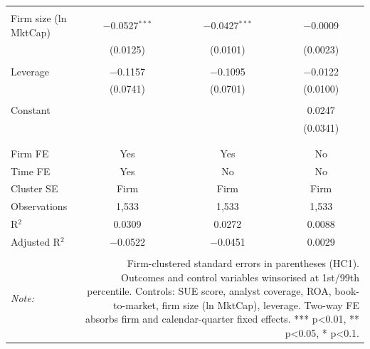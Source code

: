 \begin{table}[!htbp]
\begin{tabular}{@{\extracolsep{5pt}}lccc}
  & & & \\ 
 Firm size (ln MktCap) & $-$0.0527$^{***}$ & $-$0.0427$^{***}$ & $-$0.0009 \\ 
  & (0.0125) & (0.0101) & (0.0023) \\ 
  & & & \\ 
 Leverage & $-$0.1157 & $-$0.1095 & $-$0.0122 \\ 
  & (0.0741) & (0.0701) & (0.0100) \\ 
  & & & \\ 
 Constant &  &  & 0.0247 \\ 
  &  &  & (0.0341) \\ 
  & & & \\ 
\hline \\[-1.8ex] 
Firm FE & Yes & Yes & No \\ 
Time FE & Yes & No & No \\ 
Cluster SE & Firm & Firm & Firm \\ 
Observations & 1,533 & 1,533 & 1,533 \\ 
R$^{2}$ & 0.0309 & 0.0272 & 0.0088 \\ 
Adjusted R$^{2}$ & $-$0.0522 & $-$0.0451 & 0.0029 \\ 
\hline 
\hline \\[-1.8ex] 
\textit{Note:}  & \multicolumn{3}{r}{Firm-clustered standard errors in parentheses (HC1). Outcomes and control variables winsorised at 1st/99th percentile. Controls: SUE score, analyst coverage, ROA, book-to-market, firm size (ln MktCap), leverage. Two-way FE absorbs firm and calendar-quarter fixed effects. *** p<0.01, ** p<0.05, * p<0.1.} \\ 
\end{tabular} 
\end{table} 
